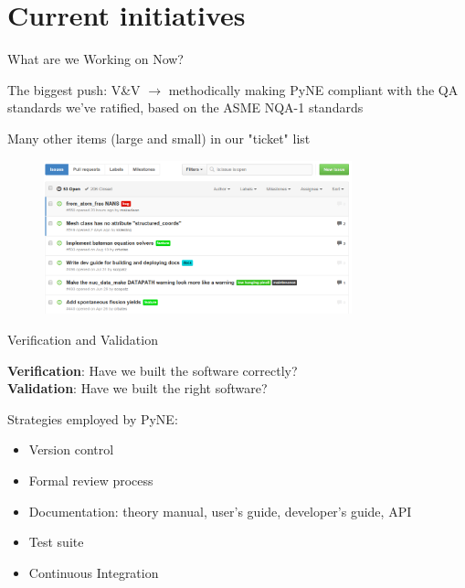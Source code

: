 \documentclass[xcolor=x11names,compress]{beamer}
\renewcommand{\(}{\begin{columns}}
\renewcommand{\)}{\end{columns}}
\newcommand{\<}[1]{\begin{column}{#1}}
\renewcommand{\>}{\end{column}}
\begin{document}
\section{Current initiatives}
\begin{frame}{What are we Working on Now?}

    The biggest push: V\&V $\rightarrow$ methodically making PyNE compliant 
    with the QA standards we've ratified, based on the ASME NQA-1 standards
    \cite{pyne_vnv}

    \vspace*{1 em}
    Many other items (large and small) in our "ticket" list
    
    \begin{center}
 	\begin{figure}
 	\includegraphics[height=1.75in,clip]{PyNE-tickets}
    \end{figure}
 	\end{center}
    
\end{frame}

\begin{frame}{Verification and Validation}

    \textbf{Verification}: Have we built the software correctly?\\
    \textbf{Validation}: Have we built the right software?
    
    \vspace*{1 em}
    Strategies employed by PyNE:
    \begin{itemize}
    \item Version control
    \item Formal review process
    \item Documentation: theory manual, user's guide, developer's guide, API
    \item Test suite
    \item Continuous Integration
    \end{itemize}

\end{frame}
\end{document}
